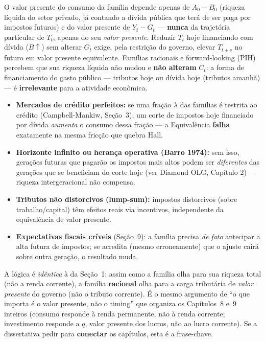 \documentclass[12pt, a4paper]{article}
\begin{document}
\begin{fatorbox}[title={O resultado: irrelevância do \emph{timing} dos tributos}]
O valor presente do consumo da família depende apenas de $A_0-B_0$ (riqueza
líquida do setor privado, já contando a dívida pública que terá de ser paga
por impostos futuros) e do valor presente de $Y_t-G_t$ --- \textbf{nunca}
da trajetória particular de $T_t$, apenas do seu \emph{valor presente}.
Reduzir $T_t$ hoje financiando com dívida ($B\uparrow$) sem alterar $G_t$
exige, pela restrição do governo, elevar $T_{t+s}$ no futuro em valor
presente equivalente. Famílias racionais e forward-looking (PIH) percebem
que sua riqueza líquida não mudou e \textbf{não alteram} $C_t$: a forma de
financiamento do gasto público --- tributos hoje ou dívida hoje (tributos
amanhã) --- é \textbf{irrelevante} para a atividade econômica.
\end{fatorbox}

\begin{armbox}[title={Premissas necessárias --- onde a Equivalência Ricardiana quebra}]
\begin{itemize}[leftmargin=*]
  \item \textbf{Mercados de crédito perfeitos:} se uma fração $\lambda$ das
    famílias é restrita ao crédito (Campbell-Mankiw, Seção~3), um corte de
    impostos hoje financiado por dívida \emph{aumenta} o consumo dessa
    fração --- a Equivalência \textbf{falha} exatamente na mesma fricção que
    quebra Hall.
  \item \textbf{Horizonte infinito ou herança operativa (Barro 1974):} sem
    isso, gerações futuras que pagarão os impostos mais altos podem ser
    \emph{diferentes} das gerações que se beneficiam do corte hoje (ver
    Diamond OLG, Capítulo 2) --- riqueza intergeracional não compensa.
  \item \textbf{Tributos não distorcivos (lump-sum):} impostos distorcivos
    (sobre trabalho/capital) têm efeitos reais via incentivos, independente
    da equivalência de valor presente.
  \item \textbf{Expectativas fiscais críveis} (Seção~9): a família precisa
    \emph{de fato} antecipar a alta futura de impostos; se acredita (mesmo
    erroneamente) que o ajuste cairá sobre outra geração, o resultado muda.
\end{itemize}
\end{armbox}

\begin{provabox}[title={A costura: Equivalência Ricardiana é a PIH aplicada ao setor público}]
A lógica é \emph{idêntica} à da Seção~1: assim como a família olha para sua
riqueza total (não a renda corrente), a família \textbf{racional} olha para
a carga tributária de \emph{valor presente} do governo (não o tributo
corrente). É o mesmo argumento de ``o que importa é o valor presente, não o
timing'' que organiza os Capítulos~8 e~9 inteiros (consumo responde à renda
permanente, não à renda corrente; investimento responde a $q$, valor
presente dos lucros, não ao lucro corrente). Se a dissertativa pedir para
\textbf{conectar} os capítulos, esta é a frase-chave.
\end{provabox}
\end{document}
